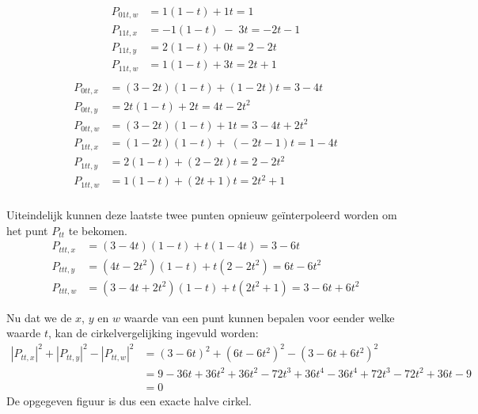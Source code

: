 \begin{enumerate}
{\begin{itemize}
\begin{equation*}
\begin{split}
					P_{01t, w} & = 1  (1 - t) + 1  t = 1 \\
					P_{11t, x} & = - 1  (1 - t) \;-\;3  t = -2t - 1 \\
					P_{11t, y} & = 2  (1 - t) + 0  t = 2 - 2t \\
					P_{11t, w} & = 1  (1 - t) + 3  t = 2t + 1 \\
				\end{split}
			\end{equation*}
			\begin{equation*}
				\begin{split}
					P_{0tt, x} & = (3-2t)(1 - t) + (1 - 2t)t = 3 - 4t \\
					P_{0tt, y} & = 2t(1 - t) + 2t = 4t - 2t^2 \\
					P_{0tt, w} & = (3 - 2t)(1 - t) + 1t = 3 - 4t +2t^2\\
					P_{1tt, x} & = (1 - 2t)(1 - t) + \;(-\;2t - 1)t = 1 - 4t \\
					P_{1tt, y} & = 2(1 - t) + (2 - 2t)t = 2 -2t^2 \\
					P_{1tt, w} & = 1(1 - t) + (2t + 1)t = 2t^2 + 1 \\
				\end{split}
			\end{equation*}

			Uiteindelijk kunnen deze laatste twee punten opnieuw geïnterpoleerd worden om het punt $P_{tt}$ te bekomen.
			\begin{equation*}
				\begin{split}
					P_{ttt, x} & = (3-4t)(1-t) + t(1-4t) = 3-6t \\
					P_{ttt, y} & = (4t-2t^2)(1-t)+ t(2-2t^2) = 6t-6t^2\\
					P_{ttt, w} & = (3-4t+2t^2)(1-t) + t(2t^2 + 1) = 3-6t+6t^2
				\end{split}
			\end{equation*}

			Nu dat we de $x$, $y$ en $w$ waarde van een punt kunnen bepalen voor eender welke waarde $t$, kan de cirkelvergelijking ingevuld worden: 
			\begin{equation*}
				\begin{split}
					|P_{tt, x}|^2 + |P_{tt, y}|^2 - |P_{tt, w}|^2 & = (3-6t)^2 + (6t-6t^2)^2 - (3-6t+6t^2)^2 \\
																  & = 9 - 36t + 36t^2 + 36t^2 - 72t^3 + 36t^4 - 36t^4 + 72t^3 - 72t^2 + 36t - 9 \\
																  & = 0
				\end{split}
			\end{equation*}
			De opgegeven figuur is dus een exacte halve cirkel.
		 \end{itemize}
		 }
			

\end{enumerate}
